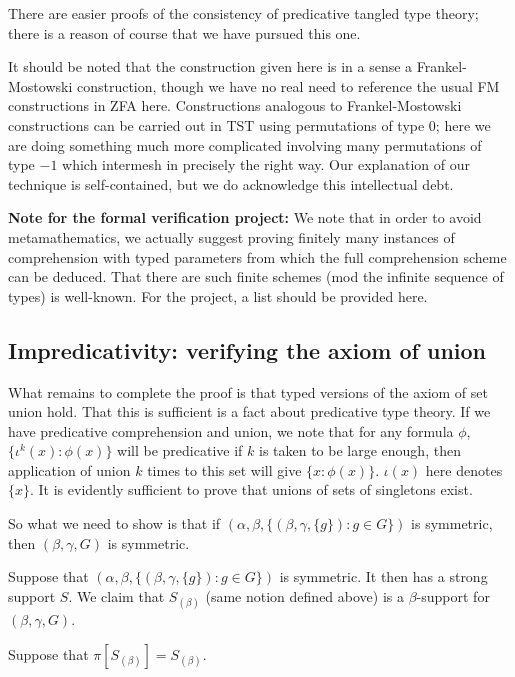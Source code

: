 \documentclass[112pt]{article}
\begin{document}
There are easier proofs of the consistency of predicative tangled type theory;  there is a reason of course that we have pursued this one.

It should be noted that the construction given here is in a sense a Frankel-Mostowski construction, though we have no real need to reference the usual
FM constructions in ZFA here.  Constructions analogous to Frankel-Mostowski constructions can be carried out in TST using permutations of type 0;  here we are doing something much more complicated involving many permutations of type $-1$ which intermesh in precisely the right way.  Our explanation of our technique is self-contained, but we do acknowledge this intellectual debt.

{\bf Note for the formal verification project:}  We note that in order to avoid metamathematics, we actually suggest proving finitely many instances of comprehension with typed parameters from which the full comprehension scheme can be deduced.  That there are such finite schemes (mod the infinite sequence of types) is well-known.  For the project, a list should be provided here.

\newpage
\subsection{Impredicativity:  verifying the axiom of union}

What remains to complete the proof is that typed versions of the axiom of set union hold.  That this is sufficient is a fact about predicative type theory.
If we have predicative comprehension and union, we note that for any formula $\phi$, $\{\iota^k(x):\phi(x)\}$ will be predicative if $k$ is taken to be large enough, then application of union $k$ times to this set will give $\{x:\phi(x)\}$.  $\iota(x)$ here denotes $\{x\}$.  It is evidently sufficient to prove that unions of sets of singletons exist.

So what we need to show is that if $(\alpha,\beta,\{(\beta,\gamma,\{g\}):g \in G\})$ is symmetric, then $(\beta,\gamma,G)$ is symmetric.

Suppose that $(\alpha,\beta,\{(\beta,\gamma,\{g\}):g \in G\})$ is symmetric.  It then has a strong support $S$.  We claim that $S_{(\beta)}$ (same notion defined above) is a $\beta$-support for $(\beta,\gamma,G)$.

Suppose that $\pi[S_{(\beta)}]=S_{(\beta)}$.  
\end{document}
